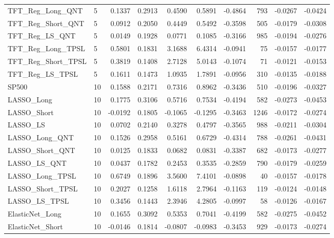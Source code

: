 \begin{tabular}{llrrrrrrrr}
\cline{1-10}
TFT\_Reg\_Long\_QNT & 5 & 0.1337 & 0.2913 & 0.4590 & 0.5891 & -0.4864 & 793 & -0.0267 & -0.0424 \\
\cline{1-10}
TFT\_Reg\_Short\_QNT & 5 & 0.0912 & 0.2050 & 0.4449 & 0.5492 & -0.3598 & 505 & -0.0179 & -0.0308 \\
\cline{1-10}
TFT\_Reg\_LS\_QNT & 5 & 0.0149 & 0.1928 & 0.0771 & 0.1085 & -0.3166 & 985 & -0.0194 & -0.0276 \\
\cline{1-10}
TFT\_Reg\_Long\_TPSL & 5 & 0.5801 & 0.1831 & 3.1688 & 6.4314 & -0.0941 & 75 & -0.0157 & -0.0177 \\
\cline{1-10}
TFT\_Reg\_Short\_TPSL & 5 & 0.3819 & 0.1408 & 2.7128 & 5.0143 & -0.1074 & 71 & -0.0121 & -0.0153 \\
\cline{1-10}
TFT\_Reg\_LS\_TPSL & 5 & 0.1611 & 0.1473 & 1.0935 & 1.7891 & -0.0956 & 310 & -0.0135 & -0.0188 \\
\cline{1-10}
SP500 & 10 & 0.1588 & 0.2171 & 0.7316 & 0.8962 & -0.3436 & 510 & -0.0196 & -0.0327 \\
\cline{1-10}
LASSO\_Long & 10 & 0.1775 & 0.3106 & 0.5716 & 0.7534 & -0.4194 & 582 & -0.0273 & -0.0453 \\
\cline{1-10}
LASSO\_Short & 10 & -0.0192 & 0.1805 & -0.1065 & -0.1295 & -0.3463 & 1246 & -0.0172 & -0.0274 \\
\cline{1-10}
LASSO\_LS & 10 & 0.0702 & 0.2140 & 0.3278 & 0.4797 & -0.3565 & 988 & -0.0211 & -0.0304 \\
\cline{1-10}
LASSO\_Long\_QNT & 10 & 0.1526 & 0.2958 & 0.5161 & 0.6729 & -0.4314 & 788 & -0.0261 & -0.0431 \\
\cline{1-10}
LASSO\_Short\_QNT & 10 & 0.0125 & 0.1833 & 0.0682 & 0.0831 & -0.3387 & 682 & -0.0173 & -0.0277 \\
\cline{1-10}
LASSO\_LS\_QNT & 10 & 0.0437 & 0.1782 & 0.2453 & 0.3535 & -0.2859 & 790 & -0.0179 & -0.0259 \\
\cline{1-10}
LASSO\_Long\_TPSL & 10 & 0.6749 & 0.1896 & 3.5600 & 7.4101 & -0.0898 & 40 & -0.0157 & -0.0178 \\
\cline{1-10}
LASSO\_Short\_TPSL & 10 & 0.2027 & 0.1258 & 1.6118 & 2.7964 & -0.1163 & 119 & -0.0124 & -0.0148 \\
\cline{1-10}
LASSO\_LS\_TPSL & 10 & 0.3456 & 0.1443 & 2.3946 & 4.2805 & -0.0997 & 58 & -0.0126 & -0.0167 \\
\cline{1-10}
ElasticNet\_Long & 10 & 0.1655 & 0.3092 & 0.5353 & 0.7041 & -0.4199 & 582 & -0.0275 & -0.0452 \\
\cline{1-10}
ElasticNet\_Short & 10 & -0.0146 & 0.1814 & -0.0807 & -0.0983 & -0.3453 & 929 & -0.0173 & -0.0274 \\

\end{tabular}
